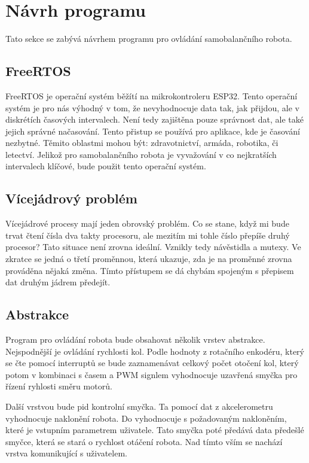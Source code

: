 \section{Návrh programu}

Tato sekce se zabývá návrhem programu pro ovládání samobalančního robota.

\subsection{FreeRTOS}
FreeRTOS je operační systém běžítí na mikrokontroleru ESP32. Tento operační systém je pro nás výhodný v tom, že nevyhodnocuje data tak, jak přijdou, ale v diskrétích časových intervalech. Není tedy zajištěna pouze správnost dat, ale také jejich správné načasování. Tento přistup se používá pro aplikace, kde je časování nezbytné. Těmito oblastmi mohou být: zdravotnictví, armáda, robotika, či letectví. Jelikož pro samobalančního robota je vyvažování v co nejkratších intervalech klíčové, bude použit tento operační systém.

\subsection{Vícejádrový problém}
Vícejádrové procesy mají jeden obrovský problém. Co se stane, když mi bude trvat čtení čísla dva takty procesoru, ale mezitím mi tohle číslo přepíše druhý procesor? Tato situace není zrovna ideální. Vznikly tedy návěstidla a mutexy. Ve zkratce se jedná o třetí proměnnou, která ukazuje, zda je na proměnné zrovna prováděna nějaká změna. Tímto přístupem se dá chybám spojeným s přepisem dat druhým jádrem předejít.

\subsection{Abstrakce}
Program pro ovládání robota bude obsahovat několik vrstev abstrakce. Nejspodnější je ovládání rychlosti kol. Podle hodnoty z rotačního enkodéru, který se čte pomocí interruptů se bude zaznamenávat celkový počet otočení kol, který potom v kombinaci s časem a PWM signlem vyhodnocuje uzavřená smyčka pro řízení ryhlosti směru motorů.
\newline

Další vrstvou bude pid kontrolní smyčka. Ta pomocí dat z akcelerometru vyhodnocuje naklonění robota. Do vyhodnocuje s požadovaným nakloněním, které je vstupním parametrem uživatele. Tato smyčka poté předává data předešlé smyčce, která se stará o rychlost otáčení robota. Nad tímto vším se nachází vrstva komunikující s uživatelem.
\newline

